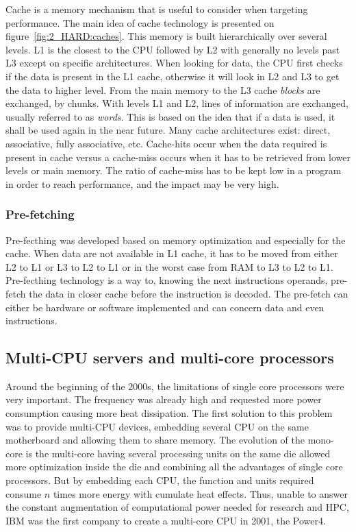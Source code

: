 Cache is a memory mechanism that is useful to consider when targeting performance. 
The main idea of cache technology is presented on figure~\ref{fig:2_HARD:caches}.
This memory is built hierarchically over several levels. 
L1 is the closest to the CPU followed by L2 with generally no levels past L3 except on specific architectures. 
When looking for data, the CPU first checks if the data is present in the L1 cache, otherwise it will look in L2 and L3 to get the data to higher level. 
From the main memory to the L3 cache \textit{blocks} are exchanged, by chunks. 
With levels L1 and L2, lines of information are exchanged, usually referred to as \textit{words}.
This is based on the idea that if a data is used, it shall be used again in the near future.
Many cache architectures exist: direct, associative, fully associative, etc. 
Cache-hits occur when the data required is present in cache versus a cache-miss occurs when it has to be retrieved from lower levels or main memory. 
The ratio of cache-miss has to be kept low in a program in order to reach performance, and the impact may be very high.

\subsubsection{Pre-fetching} 
Pre-fecthing was developed based on memory optimization and especially for the cache.
When data are not available in L1 cache, it has to be moved from either L2 to L1 or L3 to L2 to L1 or in the worst case from RAM to L3 to L2 to L1. 
Pre-fecthing technology is a way to, knowing the next instructions operands, pre-fetch the data in closer cache before the instruction is decoded. 
The pre-fetch can either be hardware or software implemented and can concern data and even instructions.

\subsection{Multi-CPU servers and multi-core processors}
Around the beginning of the 2000s, the limitations of single core processors were very important. 
The frequency was already high and requested more power consumption causing more heat dissipation. 
The first solution to this problem was to provide multi-CPU devices, embedding several CPU on the same motherboard and allowing them to share memory. 
The evolution of the mono-core is the multi-core having several processing units on the same die allowed more optimization inside the die and combining all the advantages of single core processors.
But by embedding each CPU, the function and units required consume $n$ times more energy with cumulate heat effects.
Thus, unable to answer the constant augmentation of computational power needed for research and HPC, IBM was the first company to create a multi-core CPU in 2001, the Power4. 


